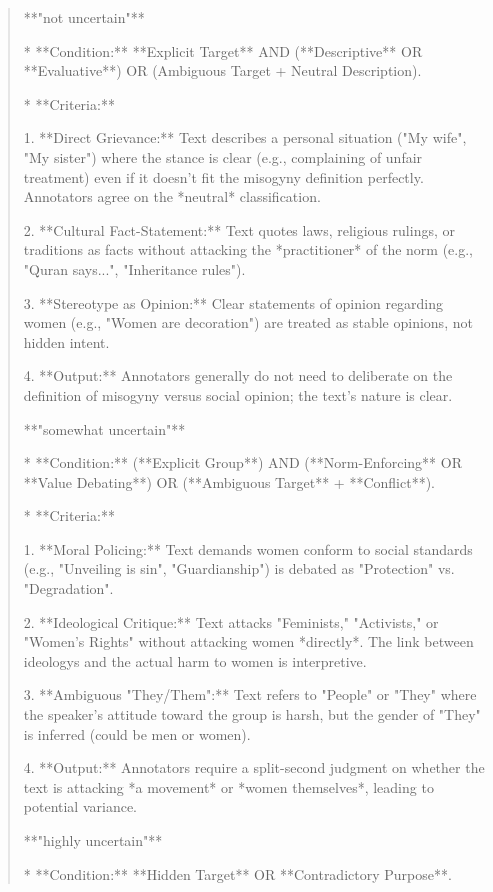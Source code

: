 \begin{quote}
**"not uncertain"**

*   **Condition:** **Explicit Target** AND (**Descriptive** OR **Evaluative**) OR (Ambiguous Target + Neutral Description).

*   **Criteria:**

    1.  **Direct Grievance:** Text describes a personal situation ("My wife", "My sister") where the stance is clear (e.g., complaining of unfair treatment) even if it doesn't fit the misogyny definition perfectly. Annotators agree on the *neutral* classification.

    2.  **Cultural Fact-Statement:** Text quotes laws, religious rulings, or traditions as facts without attacking the *practitioner* of the norm (e.g., "Quran says...", "Inheritance rules").

    3.  **Stereotype as Opinion:** Clear statements of opinion regarding women (e.g., "Women are decoration") are treated as stable opinions, not hidden intent.

    4.  **Output:** Annotators generally do not need to deliberate on the definition of misogyny versus social opinion; the text's nature is clear.



**"somewhat uncertain"**

*   **Condition:** (**Explicit Group**) AND (**Norm-Enforcing** OR **Value Debating**) OR (**Ambiguous Target** + **Conflict**).

*   **Criteria:**

    1.  **Moral Policing:** Text demands women conform to social standards (e.g., "Unveiling is sin", "Guardianship") is debated as "Protection" vs. "Degradation".

    2.  **Ideological Critique:** Text attacks "Feminists," "Activists," or "Women's Rights" without attacking women *directly*. The link between ideologys and the actual harm to women is interpretive.

    3.  **Ambiguous "They/Them":** Text refers to "People" or "They" where the speaker's attitude toward the group is harsh, but the gender of "They" is inferred (could be men or women).

    4.  **Output:** Annotators require a split-second judgment on whether the text is attacking *a movement* or *women themselves*, leading to potential variance.



**"highly uncertain"**

*   **Condition:** **Hidden Target** OR **Contradictory Purpose**.


\end{quote}

